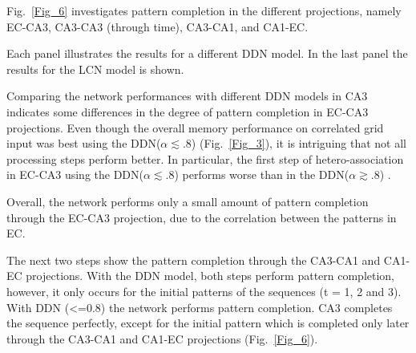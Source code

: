 \documentclass[utf8]{frontiersSCNS} %
\begin{document}
Fig.~\ref{Fig_6} investigates pattern completion in the different projections, namely EC-CA3, CA3-CA3 (through time), CA3-CA1, and CA1-EC.


Each panel illustrates the results for a different DDN model. In the last panel the results for the LCN model is shown. 


Comparing the network performances with different DDN models in CA3 indicates some differences in the degree of pattern completion in EC-CA3 projections.   
Even though the overall memory performance on correlated grid input was best using the DDN($\alpha \lesssim .8$) (Fig.~\ref{Fig_3}), it is intriguing that not all processing steps perform better. In particular, the first step of hetero-association in EC-CA3 using the DDN($\alpha \lesssim .8$)  performs worse than in the DDN($\alpha \gtrsim .8$) .
%
 
Overall, the network performs only a small amount of pattern completion through the EC-CA3 projection, due to the correlation between the patterns in EC.

%
The next two steps show the pattern completion through the CA3-CA1 and CA1-EC projections. With the DDN model, both steps perform pattern completion, however, it only occurs for the initial patterns of the sequences (t = 1, 2 and 3). 
With DDN (<=0.8) the network performs pattern completion. CA3 completes the sequence perfectly, except for the initial pattern which is completed only later through the CA3-CA1 and CA1-EC projections (Fig.~\ref{Fig_6}).  
\end{document}
